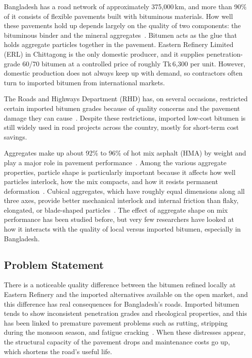 \documentclass[12pt,a4paper]{article}
\begin{document}
Bangladesh has a road network of approximately 375,000\,km, and more than 90\% of it consists of flexible pavements built with bituminous materials. How well these pavements hold up depends largely on the quality of two components: the bituminous binder and the mineral aggregates~\cite{werkineh2020assessment}. Bitumen acts as the glue that holds aggregate particles together in the pavement. Eastern Refinery Limited (ERL) in Chittagong is the only domestic producer, and it supplies penetration-grade 60/70 bitumen at a controlled price of roughly Tk\,6,300 per unit. However, domestic production does not always keep up with demand, so contractors often turn to imported bitumen from international markets.

The Roads and Highways Department (RHD) has, on several occasions, restricted certain imported bitumen grades because of quality concerns and the pavement damage they can cause~\cite{imran2025developing}. Despite these restrictions, imported low-cost bitumen is still widely used in road projects across the country, mostly for short-term cost savings.

Aggregates make up about 92\% to 96\% of hot mix asphalt (HMA) by weight and play a major role in pavement performance~\cite{rajkumar2018experimental}. Among the various aggregate properties, particle shape is particularly important because it affects how well particles interlock, how the mix compacts, and how it resists permanent deformation~\cite{teja2020effect}. Cubical aggregates, which have roughly equal dimensions along all three axes, provide better mechanical interlock and internal friction than flaky, elongated, or blade-shaped particles~\cite{sumanth2017study}. The effect of aggregate shape on mix performance has been studied before, but very few researchers have looked at how it interacts with the quality of local versus imported bitumen, especially in Bangladesh.

\subsection{Problem Statement}

There is a noticeable quality difference between the bitumen refined locally at Eastern Refinery and the imported alternatives available on the open market, and this difference has real consequences for Bangladesh's roads. Imported bitumen tends to show inconsistent penetration grades and rheological properties, and this has been linked to premature pavement problems such as rutting, stripping during the monsoon season, and fatigue cracking~\cite{khairandish2020influence}. When these distresses appear, the structural capacity of the pavement drops and maintenance costs go up, which shortens the road's useful life.
\end{document}
